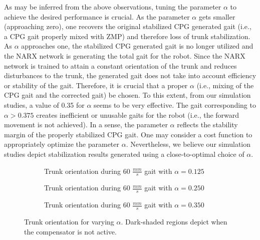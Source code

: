 As may be inferred from the above observations, tuning the parameter $\alpha$ to achieve the desired performance is crucial. As the parameter $\alpha$ gets smaller (approaching zero), one recovers the original stabilized CPG generated gait (i.e., a CPG gait properly mixed with ZMP) and therefore loss of trunk stabilization. As $\alpha$ approaches one, the stabilized CPG generated gait is no longer utilized and the NARX network is generating the total gait for the robot. Since the NARX network is trained to attain a constant orientation of the trunk and reduces disturbances to the trunk, the generated gait does not take into account efficiency or  stability of the gait. Therefore, it is crucial that a proper $\alpha$ (i.e., mixing of the CPG gait and the corrected gait) be chosen. To this extent, from our simulation studies, a value of 0.35 for $\alpha$ seems to be very effective. The gait corresponding to $\alpha > 0.375$ creates inefficient or unusable gaits for the robot (i.e., the forward movement is not achieved). In a sense, the parameter $\alpha$ reflects the stability margin of the properly stabilized CPG gait. One may consider a cost function to appropriately optimize the parameter $\alpha$. Nevertheless, we believe our simulation studies depict stabilization results generated using a close-to-optimal choice of $\alpha$.

\begin{figure}[b!]
	\vspace{-5mm}
	\centering
	\begin{subfigure}{0.475\textwidth}
		\centering
		\caption{Trunk orientation during 60 $\frac{mm}{s}$ gait with $\alpha = 0.125$ }
	\end{subfigure}
	\begin{subfigure}{0.475\textwidth}
		\centering
		\caption{Trunk orientation during 60 $\frac{mm}{s}$ gait with $\alpha = 0.250$ }
	\end{subfigure}
	\begin{subfigure}{0.475\textwidth}
		\centering
		\caption{Trunk orientation during 60 $\frac{mm}{s}$ gait with $\alpha = 0.350$ }
	\end{subfigure}
	\caption{Trunk orientation for varying $\alpha$. Dark-shaded regions depict when the compensator is not active.}
	\label{fig::alpha_tests}
\end{figure}




